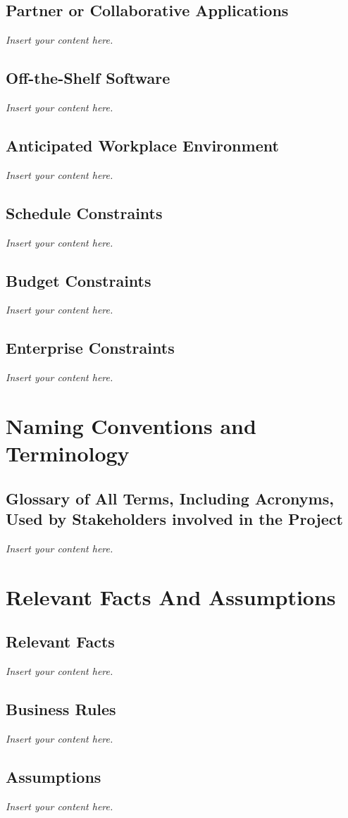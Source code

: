 \documentclass[12pt]{article}
\newcommand{\lips}{\textit{Insert your content here.}}
\begin{document}
\subsection{Partner or Collaborative Applications}
\lips
\subsection{Off-the-Shelf Software}
\lips
\subsection{Anticipated Workplace Environment}
\lips
\subsection{Schedule Constraints}
\lips
\subsection{Budget Constraints}
\lips
\subsection{Enterprise Constraints}
\lips

\section{Naming Conventions and Terminology}
\subsection{Glossary of All Terms, Including Acronyms, Used by Stakeholders
involved in the Project}
\lips

\section{Relevant Facts And Assumptions}
\subsection{Relevant Facts}
\lips
\subsection{Business Rules}
\lips
\subsection{Assumptions}
\lips
\end{document}

